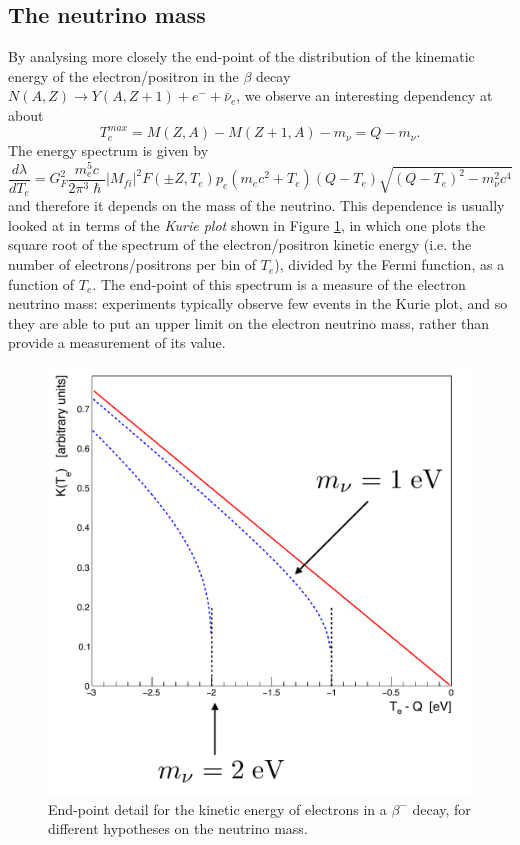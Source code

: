 \subsection{The neutrino mass}
\label{sec:NeutrinoMass}
By analysing more closely the end-point of the distribution of the kinematic energy of the electron/positron in the $\beta$ decay \(N(A,Z)\to Y(A, Z+1)+e^-+\bar{\nu}_e\), we observe an interesting dependency at about
\begin{equation*}
    T_e^{max} = M(Z,A) - M(Z+1, A)- m_\nu = Q - m_\nu.
\end{equation*}
The energy spectrum is given by
\begin{equation*}
    \frac{d\lambda}{dT_e} = G_F^2 \frac{m_e^5c}{2\pi^3 \hslash} |M_{fi}|^2 F(\pm Z, T_e) p_e(m_ec^2 + T_e) (Q-T_e) \sqrt{(Q-T_e)^2 - m_\nu^2 c^4}
\end{equation*}
and therefore it depends on the mass of the neutrino. This dependence is usually looked at in terms of the \emph{Kurie plot} shown in Figure \ref{nuclear-physics-fig:21}, in which one plots the square root of the spectrum of the electron/positron kinetic energy (i.e. the number of electrons/positrons per bin of \(T_e\)), divided by the Fermi function, as a function of \(T_e\). The end-point of this spectrum is a measure of the electron neutrino mass: experiments typically observe few events in the Kurie plot, and so they are able to put an upper limit on the electron neutrino mass, rather than provide a measurement of its value.
\begin{figure}
    \centering
    \includegraphics[scale=0.3]{Figures/nuclear-physics-fig21}
    \caption{End-point detail for the kinetic energy of electrons in a \(\beta^-\) decay, for different hypotheses on the neutrino mass.}
    \label{nuclear-physics-fig:21}
\end{figure}

